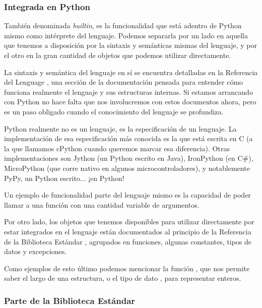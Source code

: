 \subsubsection{Integrada en Python}\label{intro--modulos-builtin}

También denominada \textit{builtin}, es la funcionalidad que está adentro de Python mismo como intérprete del lenguaje. Podemos separarla por un lado en aquella que tenemos a disposición por la sintaxis y semánticas mismas del lenguaje, y por el otro en la gran cantidad de objetos que podemos utilizar directamente.

La sintaxis y semántica del lenguaje en sí se encuentra detalladas en la Referencia del Lenguage \cite{reflenguaje}, una sección de la documentación pensada para entender cómo funciona realmente el lenguaje y sus estructuras internas. Si estamos arrancando con Python no hace falta que nos involucremos con estos documentos ahora, pero es un paso obligado cuando el conocimiento del lenguaje se profundiza.

\begin{info}
Python realmente no es un lenguaje, es la especificación de un lenguaje. La implementación de esa especificación más conocida es la que está escrita en C (a la que llamamos cPython cuando queremos marcar esa diferencia). Otras implementaciones son Jython (un Python escrito en Java), IronPython (en C\#), MicroPython (que corre nativo en algunos microcontroladores), y notablemente PyPy, un Python escrito... ¡en Python!
\end{info}

Un ejemplo de funcionalidad parte del lenguaje mismo es la capacidad de poder llamar a una función con una cantidad variable de argumentos.

Por otro lado, los objetos que tenemos disponibles para utilizar directamente por estar integrados en el lenguaje están documentados al principio de la Referencia de la Biblioteca Estándar \cite{stdlib}, agrupados en funciones, algunas constantes, tipos de datos y excepciones.

Como ejemplos de esto último podemos mencionar la función , que nos permite saber el largo de una estructura, o el tipo de dato , para representar enteros.


\subsubsection{Parte de la Biblioteca Estándar}\label{intro--modulos-stdlib}

